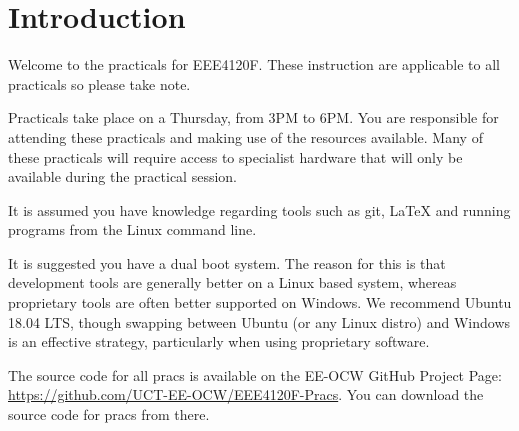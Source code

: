 \section*{Introduction}
Welcome to the practicals for EEE4120F. These instruction are applicable to all practicals so please take note.

Practicals take place on a Thursday, from 3PM to 6PM. You are responsible for attending these practicals and making use of the resources available. Many of these practicals will require access to specialist hardware that will only be available during the practical session.

It is assumed you have knowledge regarding tools such as git, \LaTeX{} and running programs from the Linux command line.

It is suggested you have a dual boot system. The reason for this is that development tools are generally better on a Linux based system, whereas proprietary tools are often better supported on Windows. We recommend Ubuntu 18.04 LTS, though swapping between Ubuntu (or any Linux distro) and Windows is an effective strategy, particularly when using proprietary software.

The source code for all pracs is available on the EE-OCW GitHub Project Page: \href{https://github.com/UCT-EE-OCW/EEE4120F-Pracs}{https://github.com/UCT-EE-OCW/EEE4120F-Pracs}. You can download the source code for pracs from there.